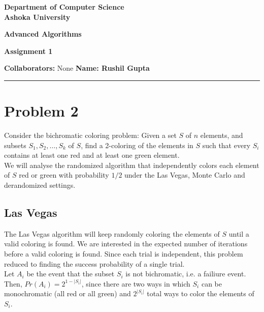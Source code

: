 \documentclass[a4paper]{article}
\begin{document}
\begin{center}
{\large \bf \color{red}  Department of Computer Science} \\
{\large \bf \color{red}  Ashoka University} \\

\vspace{0.1in}

{\large \bf \color{blue} Advanced Algorithms}

\vspace{0.05in}

    { \bf \color{YellowOrange} Assignment 1}
\end{center}
\medskip

{\textbf{Collaborators:} None} \hfill {\textbf{Name: Rushil Gupta} }

\bigskip
\hrule


\section*{Problem 2}
Consider the bichromatic coloring problem: Given a set $S$ of $n$ elements, and subsets $S_1, S_2, \ldots, S_k$ of $S$, find a 2-coloring of the elements in $S$ such that every $S_i$ contains at least one red and at least one green element. \\

\noindent We will analyse the randomized algorithm that independently colors each element of $S$ red or green with probability $1/2$ under the Las Vegas, Monte Carlo and derandomized settings. \\

\subsection*{Las Vegas}
\noindent The Las Vegas algorithm will keep randomly coloring the elements of $S$ until a valid coloring is found. We are interested in the expected number of iterations before a valid coloring is found. Since each trial is independent, this problem reduced to finding the success probability of a single trial. \\

\noindent Let $A_i$ be the event that the subset $S_i$ is not bichromatic, i.e. a failiure event. Then, $Pr(A_i) = 2^{1-|S_i|}$, since there are two ways in which $S_i$ can be monochromatic (all red or all green) and $2^{|S_i|}$ total ways to color the elements of $S_i$. \\
\end{document}
